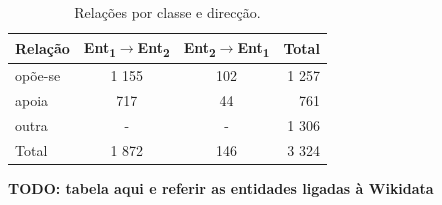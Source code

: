 \documentclass[a4paper, twocolumn, 11pt, twoside]{article}
\begin{document}

\begin{table}[!h]
    \begin{center}
    \begin{tabular}{l ccr}
        {\bf Relação} & {\bf \footnotesize{Ent\textsubscript{1}$\rightarrow$Ent\textsubscript{2}}} & {\bf \footnotesize{Ent\textsubscript{2}$\rightarrow$Ent\textsubscript{1}}} & {\bf Total} \\
        \hline
        opõe-se          &  1 155  &  102  &  1 257  \\
        apoia            &    717  &   44  &    761  \\
        outra            &    -    &   -   &  1 306  \\
		\hline
		Total			 &  1 872  &  146  &  3 324  \\
    \end{tabular}
	\caption{Relações por classe e direcção.}
	\label{tab:rel_dataset}
	\end{center}
\end{table}

{\bf TODO: tabela aqui e referir as entidades ligadas à Wikidata}

\end{document}
